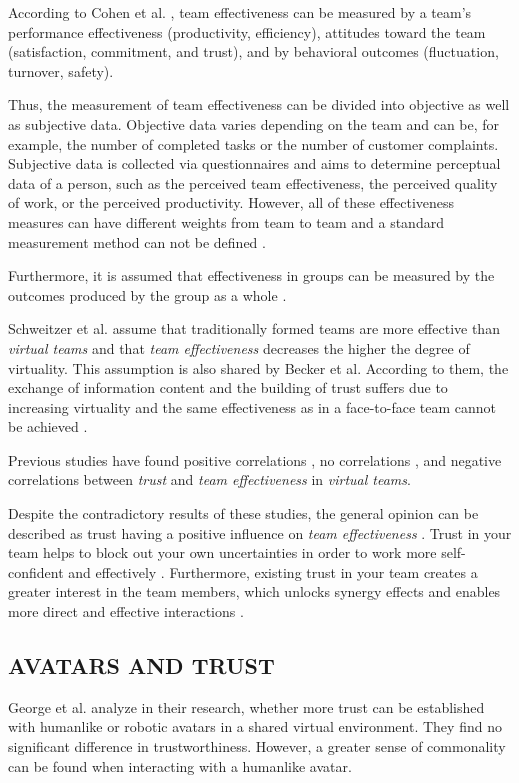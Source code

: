 \documentclass[sigchi]{acmart}
\begin{document}
According to Cohen et al. \citep{cohen1997makes}, team effectiveness can be measured by a team's performance effectiveness (productivity, efficiency), attitudes toward the team (satisfaction, commitment, and trust), and by behavioral outcomes (fluctuation, turnover, safety). 

Thus, the measurement of team effectiveness can be divided into objective as well as subjective data. Objective data varies depending on the team and can be, for example, the number of completed tasks or the number of customer complaints. Subjective data is collected via questionnaires and aims to determine perceptual data of a person, such as the perceived team effectiveness, the perceived quality of work, or the perceived productivity. However, all of these effectiveness measures can have different weights from team to team and a standard measurement method can not be defined \citep{pina2008teams}. 

Furthermore, it is assumed that effectiveness in groups can be measured by the outcomes produced by the group as a whole \citep{guzzo1996teams}. 

Schweitzer et al. \citep{schweitzer2010conceptualizing} assume that traditionally formed teams are more effective than \textit{virtual teams} and that \textit{team effectiveness} decreases the higher the degree of virtuality.
This assumption is also shared by Becker et al. According to them, the exchange of information content and the building of trust suffers due to increasing virtuality and the same effectiveness as in a face-to-face team cannot be achieved \citep{handke2019alles}.

Previous studies have found positive correlations \citep{davis2000trusted}, no correlations \citep{hertel2004managing}, and negative correlations \citep{dirks1999effects} between \textit{trust} and \textit{team effectiveness} in \textit{virtual teams}.

Despite the contradictory results of these studies, the general opinion can be described as trust having a positive influence on \textit{team effectiveness} \citep{de2016trust}. 
Trust in your team helps to block out your own uncertainties in order to work more self-confident and effectively \citep{en2010does}. Furthermore, existing trust in your team creates a greater interest in the team members, which unlocks synergy effects and enables more direct and effective interactions \citep{dirks1999effects}. 

\subsection{AVATARS AND TRUST}
George et al. \citep{george2018trusting} analyze in their research, whether more trust can be established with humanlike or robotic avatars in a shared virtual environment. They find no significant difference in trustworthiness. However, a greater sense of commonality can be found when interacting with a humanlike avatar.
\end{document}
